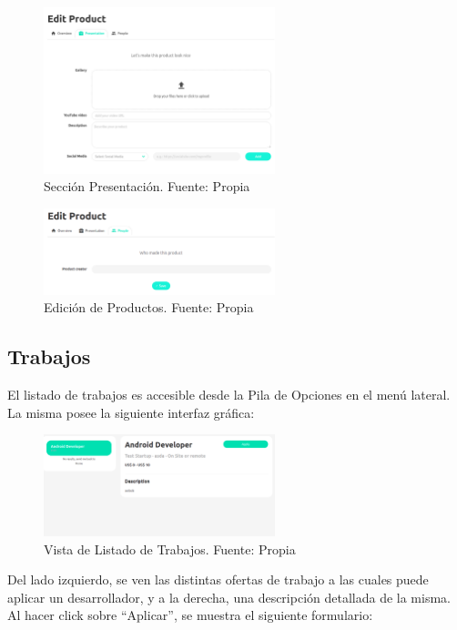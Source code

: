 \begin{figure}[H]
\centering
\includegraphics[width=0.60\textwidth]{img/47.png}
\caption{Sección Presentación. Fuente: Propia}
\label{figure:productPresentation}
\end{figure}

\begin{figure}[H]
\centering
\includegraphics[width=0.60\textwidth]{img/48.png}
\caption{Edición de Productos. Fuente: Propia}
\label{figure:productEdition}
\end{figure}


\subsection{Trabajos}

El listado de trabajos es accesible desde la Pila de Opciones en el menú lateral. La misma posee la siguiente interfaz gráfica:

\begin{figure}[H]
\centering
\includegraphics[width=0.60\textwidth]{img/50.png}
\caption{
Vista de Listado de Trabajos. Fuente: Propia}
\label{figure:jobsList}
\end{figure}

Del lado izquierdo, se ven las distintas ofertas de trabajo a las cuales puede aplicar un desarrollador, y a la derecha, una descripción detallada de la misma. Al hacer click sobre “Aplicar”, se muestra el siguiente formulario:


